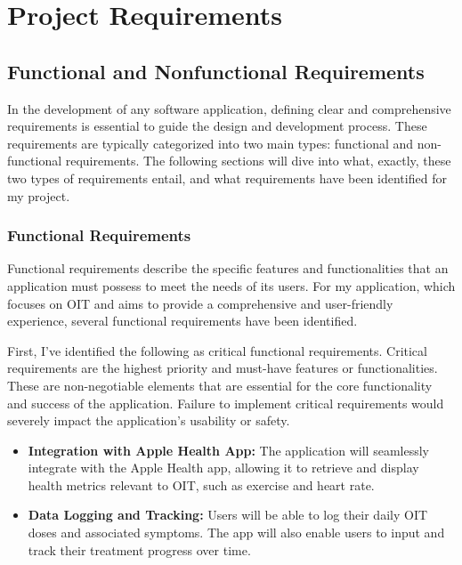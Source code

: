 \chapter{Project Requirements}

\section{Functional and Nonfunctional Requirements}

In the development of any software application, defining clear and comprehensive requirements is essential to guide the design and development process. These requirements are typically categorized into two main types: functional and non-functional requirements. The following sections will dive into what, exactly, these two types of requirements entail, and what requirements have been identified for my project.

\subsection{Functional Requirements}

Functional requirements describe the specific features and functionalities that an application must possess to meet the needs of its users. For my application, which focuses on OIT and aims to provide a comprehensive and user-friendly experience, several functional requirements have been identified.

First, I've identified the following as critical functional requirements. Critical requirements are the highest priority and must-have features or functionalities. These are non-negotiable elements that are essential for the core functionality and success of the application. Failure to implement critical requirements would severely impact the application's usability or safety.

\begin{itemize}
    \item \textbf{Integration with Apple Health App:} The application will seamlessly integrate with the Apple Health app, allowing it to retrieve and display health metrics relevant to OIT, such as exercise and heart rate.
    \item \textbf{Data Logging and Tracking:} Users will be able to log their daily OIT doses and associated symptoms. The app will also enable users to input and track their treatment progress over time.
\end{itemize}

